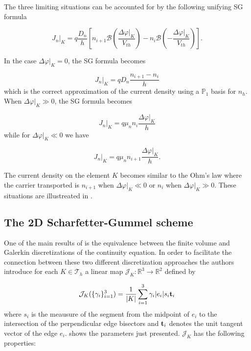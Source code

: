 The three limiting situations can be accounted for by the following unifying SG formula

 \begin{equation}
\label{eq: scharfetter gummel 1D electron}
J_n|_K=q\frac{D_n}{h}
\left[ n_{i+1}\mathcal{B}\left(\frac{\Delta \varphi|_K}{V_{th}}\right)- n_i\mathcal{B}\left(-\frac{\Delta \varphi|_K}{V_{th}}\right)\right].  
\end{equation}

In the case $\Delta \varphi|_K=0$, the SG formula becomes

\begin{equation}
J_n|_K=qD_n\frac{n_{i+1}-n_{i}}{h}
\end{equation}
which is the correct approximation of the current density using a $\mathbb{P}_1$ basis for $n_h$. When $\Delta \varphi|_K \gg 0$, the SG formula becomes

\begin{equation}
J_n|_K = q\mu_n n_{i}\dfrac{\Delta \varphi|_K}{h}
\end{equation}
while for $\Delta \varphi|_K \ll 0$ we have

\begin{equation}
J_n|_K = q\mu_n n_{i+1}\dfrac{\Delta \varphi|_K}{h}.
\end{equation}

The current density on the element $K$ becomes similar to the Ohm's law where the carrier transported is $n_{i+1}$ when $\Delta \varphi|_K \ll 0$ or $n_i$ when $\Delta \varphi|_K \gg 0$. These situations are illustreated in .

\subsection{The 2D Scharfetter-Gummel scheme}

One of the main results of \cite{Bank:FEvsBOX} is the equivalence between the finite volume and Galerkin discretizations of the continuity equation. In order to facilitate the connection between these two different discretization approaches the authors introduce for each $K \in \mathcal{T}_h$ a linear map $\mathcal{J}_{K}:\mathbb{R}^3\rightarrow\mathbb{R}^2$ defined by

\begin{equation}
\label{eq: map current}
\mathcal{J}_{K}(\{\gamma_i\}_{i=1}^3) = \dfrac{1}{|K|}\sum_{i=1}^3 \gamma_i |e_i| s_i \mathbf{t}_i
\end{equation}
where $s_i$ is the meausure of the segment from the midpoint  of $e_i$ to the intersection of the perpendicular edge bisectors and $\mathbf{t}_i$ denotes the unit tangent vector of the edge $e_i$.  shows the parameters just presented.
$\mathcal{J}_K$ has the following properties:

